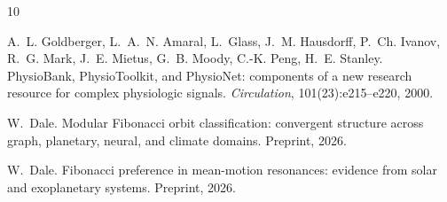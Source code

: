\documentclass[11pt]{article}
\begin{document}
\begin{thebibliography}{10}

A.~L. Goldberger, L.~A.~N. Amaral, L.~Glass, J.~M. Hausdorff, P.~Ch. Ivanov,
R.~G. Mark, J.~E. Mietus, G.~B. Moody, C.-K. Peng, H.~E. Stanley.
\newblock PhysioBank, PhysioToolkit, and PhysioNet: components of a new research resource for complex physiologic signals.
\newblock \emph{Circulation}, 101(23):e215--e220, 2000.

W.~Dale.
\newblock Modular Fibonacci orbit classification: convergent structure across graph, planetary, neural, and climate domains.
\newblock Preprint, 2026.

W.~Dale.
\newblock Fibonacci preference in mean-motion resonances: evidence from solar and exoplanetary systems.
\newblock Preprint, 2026.

\end{thebibliography}
\end{document}
